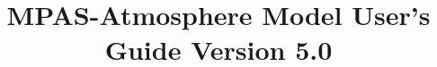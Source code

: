 \documentclass[11pt]{report}
\newcommand{\version}{5.0}
\begin{document}
\title{\bf \hfil MPAS-Atmosphere Model User's Guide \hfil \break \hfil \break Version \version}


\maketitle



\tableofcontents










\appendix






\end{document}

